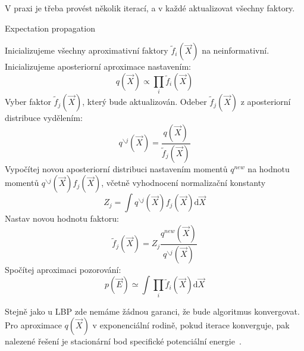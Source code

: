 V praxi je třeba provést několik iterací, a v každé aktualizovat všechny faktory.

\begin{algorithm}
\caption{Expectation propagation}
\label{alg:ep}
\begin{algorithmic}
\State Inicializujeme všechny aproximativní faktory $\tilde{f}_i(\vec{X})$ na neinformativní.
\State Inicializujeme aposteriorní aproximace nastavením: $$q(\vec{X}) \propto \prod_i \tilde{f}_i(\vec{X})$$
\Repeat
    \State Vyber faktor $\tilde{f}_j(\vec{X})$, který bude aktualizován.
    \State Odeber $\tilde{f}_j(\vec{X})$ z aposteriorní distribuce vydělením: $$q^{\backslash j} (\vec{X}) = \frac{q(\vec{X})}{\tilde{f}_j(\vec{X})}$$
    \State Vypočítej novou aposteriorní distribuci nastavením momentů $q^{new}$ na 
    \State hodnotu momentů $q^{\backslash j}(\vec{X})f_j(\vec{X})$, včetně vyhodnocení normalizační 
    \State konstanty $$Z_j = \int q^{\backslash j}(\vec{X}) f_j(\vec{X}) \mathrm{d}\vec{X}$$
    \State Nastav novou hodnotu faktoru: $$\tilde{f}_j(\vec{X}) = Z_j \frac{q^{new}(\vec{X})}{q^{\backslash j}(\vec{X})}$$
\State Spočítej aproximaci pozorování: $$p(\vec{E}) \simeq \int \prod_i \tilde{f}_i(\vec{X}) \mathrm{d}\vec{X}$$
\end{algorithmic}
\end{algorithm}

Stejně jako u LBP zde nemáme žádnou garanci, že bude algoritmus konvergovat.
Pro aproximace $q(\vec{X})$ v exponenciální rodině, pokud iterace konverguje, pak nalezené řešení je stacionární bod specifické potenciální energie~\cite{minka2001expectation}.
